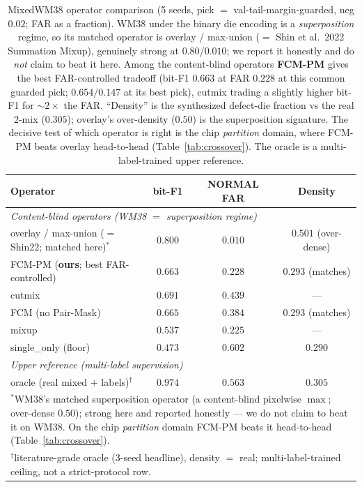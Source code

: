 \documentclass[11pt]{article}
\begin{document}
\begin{table}[t]
\centering
\caption{MixedWM38 operator comparison (5 seeds, pick $=$ val-tail-margin-guarded, neg
$0.02$; FAR as a fraction). WM38 under the binary die encoding is a
\emph{superposition} regime, so its matched operator is overlay / max-union ($=$ Shin
et al.\ 2022 Summation Mixup), genuinely strong at $0.80$/$0.010$; we report it
honestly and do \emph{not} claim to beat it here. Among the content-blind operators
\textbf{FCM-PM} gives the best FAR-controlled tradeoff (bit-F1 $0.663$ at FAR $0.228$
at this common guarded pick; $0.654/0.147$ at its best pick), cutmix trading a slightly
higher bit-F1 for ${\sim}2\times$ the FAR. ``Density'' is the synthesized defect-die
fraction vs the real 2-mix ($0.305$); overlay's over-density ($0.50$) is the
superposition signature. The decisive test of which operator is right is the chip
\emph{partition} domain, where FCM-PM beats overlay head-to-head
(Table~\ref{tab:crossover}). The oracle is a multi-label-trained upper reference.}
\label{tab:headline}
\begin{tabular}{lccc}
\toprule
Operator & bit-F1 & NORMAL FAR & Density \\
\midrule
\multicolumn{4}{l}{\emph{Content-blind operators (WM38 $=$ superposition regime)}} \\
overlay / max-union ($=$ Shin22; matched here)$^{\ast}$ & $0.800$ & $\mathbf{0.010}$ & $0.501$ (over-dense) \\
FCM-PM (\textbf{ours}; best FAR-controlled) & $0.663$ & $0.228$ & $0.293$ (matches) \\
cutmix                         & $0.691$ & $0.439$ & --- \\
FCM (no Pair-Mask)             & $0.665$ & $0.384$ & $0.293$ (matches) \\
mixup                          & $0.537$ & $0.225$ & --- \\
single\_only (floor)           & $0.473$ & $0.602$ & $0.290$ \\
\midrule
\multicolumn{4}{l}{\emph{Upper reference (multi-label supervision)}} \\
oracle (real mixed $+$ labels)$^{\dagger}$   & $0.974$ & $0.563$ & $0.305$ \\
\bottomrule
\multicolumn{4}{l}{\footnotesize $^{\ast}$WM38's matched superposition operator (a content-blind pixelwise $\max$; over-dense $0.50$); strong here and reported honestly --- we do not claim to beat it on WM38. On the chip \emph{partition} domain FCM-PM beats it head-to-head (Table~\ref{tab:crossover}).}\\
\multicolumn{4}{l}{\footnotesize $^{\dagger}$literature-grade oracle (3-seed headline), density $=$ real; multi-label-trained ceiling, not a strict-protocol row.}
\end{tabular}
\end{table}
\end{document}
